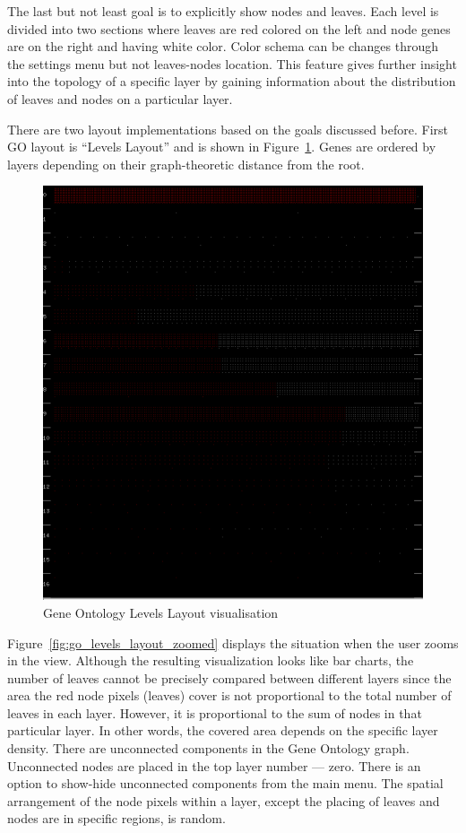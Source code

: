 The last but not least goal is to explicitly show nodes and leaves. Each level is divided into two sections where leaves are red colored on the left and node genes are on the right and having white color.
Color schema can be changes through the settings menu but not leaves-nodes location.
This feature gives further insight into the topology of a specific layer by gaining information about the distribution of leaves and nodes on a particular layer.

There are two layout implementations based on the goals discussed before. First GO layout is ``Levels Layout'' and is shown in Figure~\ref{fig:go_levels_layout}.
Genes are ordered by layers depending on their graph-theoretic distance from the root.

\begin{figure}[h!]
\centering
\includegraphics[scale=0.3]{pictures/go_levels_layout.png}
\caption{Gene Ontology Levels Layout visualisation}
\label{fig:go_levels_layout}
\end{figure}

Figure~\ref{fig:go_levels_layout_zoomed} displays the situation when the user zooms in the view.
Although the resulting visualization looks like bar charts, the number of leaves cannot be precisely compared between different layers since
the area the red node pixels (leaves) cover is not proportional to the total number of leaves in each layer.
However, it is proportional to the sum of nodes in that particular layer. In other words, the covered area depends on the specific layer density.
There are unconnected components in the Gene Ontology graph.
Unconnected nodes are placed in the top layer number --- zero. There is an option to show-hide unconnected components from the main menu.
The spatial arrangement of the node pixels within a layer, except the placing of leaves and nodes are in specific regions, is random.

